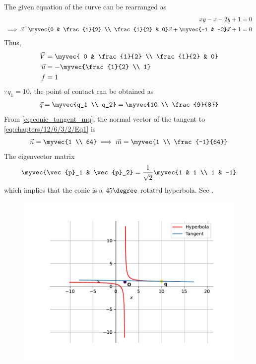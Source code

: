 The given equation of the curve can be rearranged as
\begin{align}
	xy-x-2y+1 &= 0 \\
        \label{eq:chapters/12/6/3/2/Eq1}
	\implies \vec{x}^\top\myvec{0 & \frac{1}{2} \\ \frac{1}{2} & 0}\vec{x} + \myvec{-1 & -2}\vec{x}+1 &= 0 
\end{align}
Thus, 
\begin{align}
	\vec{V} &= \myvec{ 0 & \frac{1}{2} \\ \frac{1}{2} & 0} \\
	\vec{u} &= -\myvec{\frac{1}{2} \\ 1} \\
	f &= 1 
\end{align}
$\because q_1 = 10$, the point of contact can be obtained as
\begin{align}
	 \vec{q} =\myvec{q_1 \\ q_2} = \myvec{10 \\ \frac{9}{8}}
\end{align}
  From \eqref{eq:conic_tangent_mq},
 the normal vector of the tangent to \eqref{eq:chapters/12/6/3/2/Eq1} is
\begin{align}
	\vec{n} = \myvec{1 \\ 64}
	\implies
	\vec{m} = \myvec{1 \\ \frac{-1}{64}}
\end{align}
The eigenvector matrix 
\begin{align}
	\myvec{\vec{p}_1 & \vec{p}_2} = \frac{1}{\sqrt{2}}\myvec{1 & 1 \\ 1 & -1}
\end{align}
which implies that  the conic is a $45\degree$ rotated hyperbola.
See .
\begin{figure}[H]
	\begin{center}
		\includegraphics[width=0.75\columnwidth]{chapters/12/6/3/2/figs/fig.pdf}
	\end{center}
\caption{}
\label{fig:chapters/12/6/3/2/Fig1}
\end{figure}
